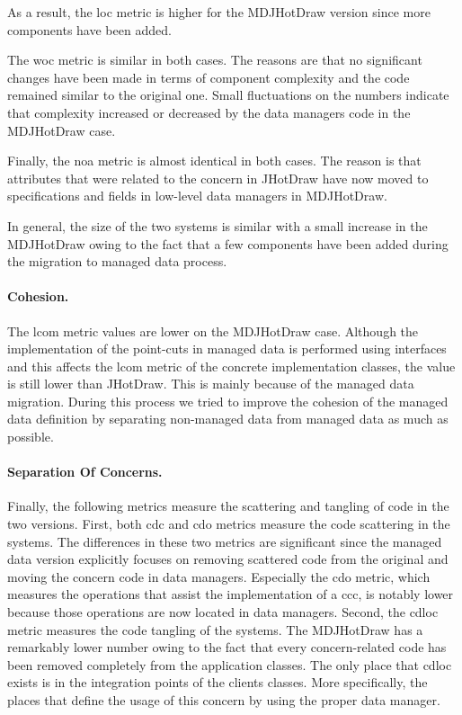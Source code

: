 As a result, the \acrlong{loc} metric is higher for the MDJHotDraw version since more components have been added.

The \acrlong{woc} metric is similar in both cases.
The reasons are that no significant changes have been made in terms of component complexity and the code remained similar to the original one.
Small fluctuations on the numbers indicate that complexity increased or decreased by the data managers code in the MDJHotDraw case.

Finally, the \acrlong{noa} metric is almost identical in both cases.
The reason is that attributes that were related to the concern in JHotDraw have now moved to specifications and fields in low-level data managers in MDJHotDraw.

In general, the size of the two systems is similar with a small increase in the MDJHotDraw owing to the fact that a few components have been added during the migration to managed data process.

\paragraph{Cohesion.} The \acrlong{lcom} metric values are lower on the MDJHotDraw case.
Although the implementation of the point-cuts in managed data is performed using interfaces and this affects the \ac{lcom} metric of the concrete implementation classes, the value is still lower than JHotDraw.
This is mainly because of the managed data migration.
During this process we tried to improve the cohesion of the managed data definition by separating non-managed data from managed data as much as possible.

\paragraph{Separation Of Concerns.} Finally, the following metrics measure the scattering and tangling of code in the two versions.
First, both \acrlong{cdc} and \acrlong{cdo} metrics measure the code scattering in the systems.
The differences in these two metrics are significant since the managed data version explicitly focuses on removing scattered code from the original and moving the concern code in data managers.
Especially the \ac{cdo} metric, which measures the operations that assist the implementation of a \ac{ccc}, is notably lower because those operations are now located in data managers.
Second, the \acrlong{cdloc} metric measures the code tangling of the systems.
The MDJHotDraw has a remarkably lower number owing to the fact that every concern-related code has been removed completely from the application classes.
The only place that \ac{cdloc} exists is in the integration points of the clients classes.
More specifically, the places that define the usage of this concern by using the proper data manager.

